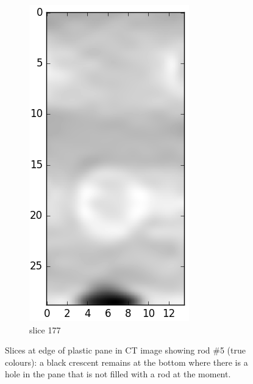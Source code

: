 \begin{figure}[!tbh]
\begin{subfigure}[b]{0.32\textwidth}
	\end{subfigure}
	\begin{subfigure}[b]{0.32\textwidth}
	  \includegraphics[width=\linewidth]{../fig/python/ph2/brightness/ph2_CT_pane@177}
	  \caption{slice 177}
	  \label{fig:ph2_CT_x100_pane_2}
	\end{subfigure}
  \caption[Slices at edge of plastic pane in CT image.]{Slices at edge of plastic pane in CT image showing rod \#5 (true colours): a black crescent remains at the bottom where there is a hole in the pane that is not filled with a rod at the moment.}
  \label{fig:ph2_CT_x100_pane}
\end{figure}

